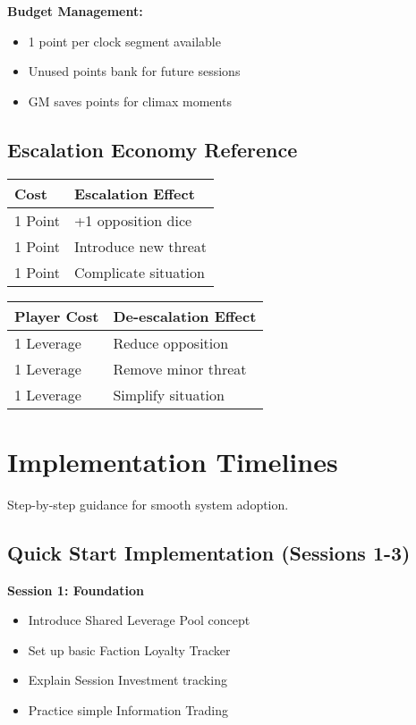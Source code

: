 \textbf{Budget Management:}
\begin{itemize}
\item 1 point per clock segment available
\item Unused points bank for future sessions
\item GM saves points for climax moments
\end{itemize}

\subsection{Escalation Economy Reference}

\begin{center}
\begin{tabular}{|l|l|}
\hline
\textbf{Cost} & \textbf{Escalation Effect} \\
\hline
1 Point & +1 opposition dice \\
1 Point & Introduce new threat \\
1 Point & Complicate situation \\
\hline
\end{tabular}
\end{center}

\begin{center}
\begin{tabular}{|l|l|}
\hline
\textbf{Player Cost} & \textbf{De-escalation Effect} \\
\hline
1 Leverage & Reduce opposition \\
1 Leverage & Remove minor threat \\
1 Leverage & Simplify situation \\
\hline
\end{tabular}
\end{center}

\section{Implementation Timelines}

Step-by-step guidance for smooth system adoption.

\subsection{Quick Start Implementation (Sessions 1-3)}

\textbf{Session 1: Foundation}
\begin{itemize}
\item Introduce Shared Leverage Pool concept
\item Set up basic Faction Loyalty Tracker
\item Explain Session Investment tracking
\item Practice simple Information Trading
\end{itemize}

